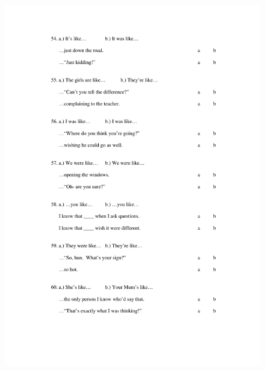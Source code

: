\begin{figure}[htbp]
	\centering
		\includegraphics[width=5in]{images/Exp1page9.pdf}
		\label{x1p9}
\end{figure}

